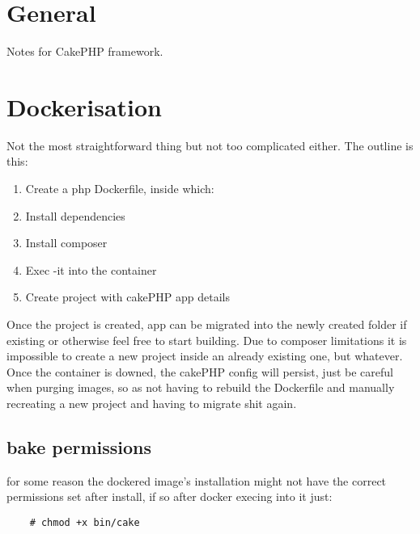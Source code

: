 \section{General}%
\label{sec:general}

Notes for CakePHP framework.

\section{Dockerisation}%
\label{sec:dockerisation}

Not the most straightforward thing but not too complicated either. The outline is this:
\begin{enumerate}
	\item Create a php Dockerfile, inside which:
	\item Install dependencies
	\item Install composer
	\item Exec -it into the container
	\item Create project with cakePHP app details
\end{enumerate}
Once the project is created, app can be migrated into the newly created folder if existing or otherwise feel free to start building. Due to composer limitations it is impossible to create a new project inside an already existing one, but whatever. Once the container is downed, the cakePHP config will persist, just be careful when purging images, so as not having to rebuild the Dockerfile and manually recreating a new project and having to migrate shit again.

\subsection{bake permissions}%
\label{sub:bake_permissions}

for some reason the dockered image's installation might not have the correct permissions set after install, if so after docker execing into it just:
\begin{verbatim}
	# chmod +x bin/cake
\end{verbatim}
